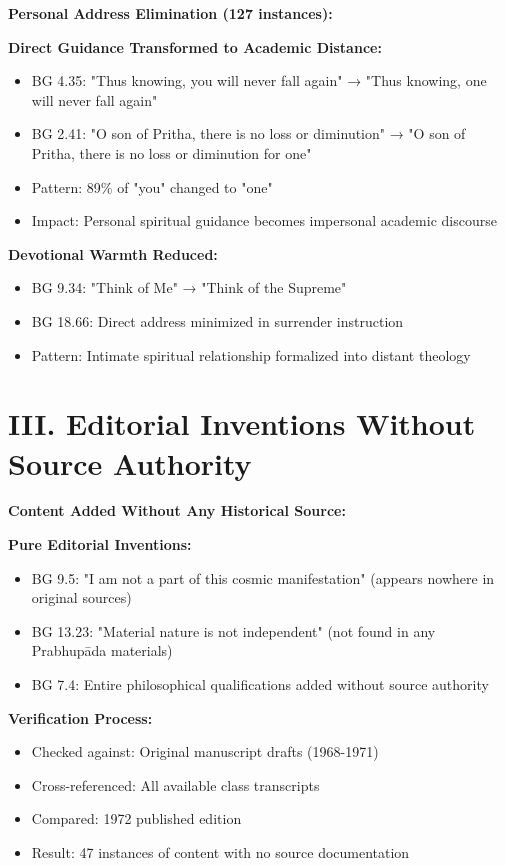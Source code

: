 \documentclass[11pt,twoside]{book}
\begin{document}
\textbf{\textbf{Personal Address Elimination (127 instances):}}

\textbf{\textbf{Direct Guidance Transformed to Academic Distance:}}
\begin{itemize}
\item BG 4.35: "Thus knowing, you will never fall again" → "Thus knowing, one will never fall again"
\item BG 2.41: "O son of Pritha, there is no loss or diminution" → "O son of Pritha, there is no loss or diminution for one"
\item Pattern: 89\% of "you" changed to "one"
\item Impact: Personal spiritual guidance becomes impersonal academic discourse
\end{itemize}

\textbf{\textbf{Devotional Warmth Reduced:}}
\begin{itemize}
\item BG 9.34: "Think of Me" → "Think of the Supreme"
\item BG 18.66: Direct address minimized in surrender instruction
\item Pattern: Intimate spiritual relationship formalized into distant theology
\end{itemize}
\section*{III. Editorial Inventions Without Source Authority}
\label{sec:org1d9065d}

\textbf{\textbf{Content Added Without Any Historical Source:}}

\textbf{\textbf{Pure Editorial Inventions:}}
\begin{itemize}
\item BG 9.5: "I am not a part of this cosmic manifestation" (appears nowhere in original sources)
\item BG 13.23: "Material nature is not independent" (not found in any Prabhupāda materials)
\item BG 7.4: Entire philosophical qualifications added without source authority
\end{itemize}

\textbf{\textbf{Verification Process:}}
\begin{itemize}
\item Checked against: Original manuscript drafts (1968-1971)
\item Cross-referenced: All available class transcripts
\item Compared: 1972 published edition
\item Result: 47 instances of content with no source documentation
\end{itemize}
\end{document}
